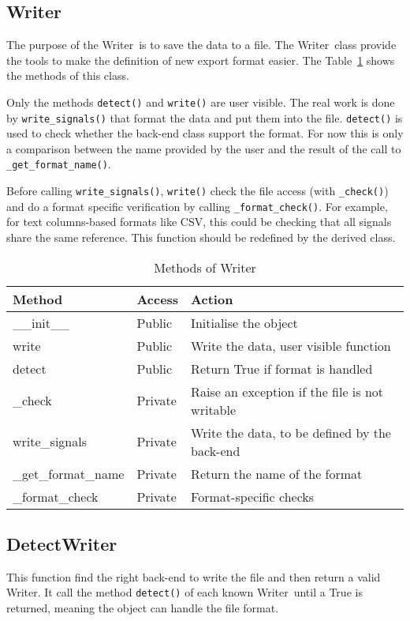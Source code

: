 \documentclass[a4paper,11pt]{article}
\newcommand{\meth}[1]{\texttt{#1()}}
\newcommand{\cls}[1]{\textsf{#1}}
\newcommand{\wrt}{\cls{Writer}}
\begin{document}
\subsection{Writer}
The purpose of the \wrt\ is to save the data to a file.
The \wrt\ class provide the tools to make the definition of new export format easier.
The Table~\ref{tab:wrts:meth} shows the methods of this class.

Only the methods \meth{detect} and \meth{write} are user visible.
The real work is done by \meth{write\_signals} that format the data and put them into the file.
\meth{detect} is used to check whether the back-end class support the format.
For now this is only a comparison between the name provided by the user and the result of the call to \meth{\_get\_format\_name}.

Before calling \meth{write\_signals}, \meth{write} check the file access (with \meth{\_check}) and do a format specific verification by calling \meth{\_format\_check}.
For example, for text columns-based formats like CSV, this could be checking that all signals share the same reference.
This function should be redefined by the derived class.

\begin{table}[htbp]
  \centering\sf\small
  \begin{tabular}{lll}
    \hline
    Method & Access & Action \\
    \hline
    \_\_init\_\_ & Public & Initialise the object \\
    write        & Public & Write the data, user visible function\\
    detect       & Public & Return True if format is handled\\
    \_check        & Private& Raise an exception if the file is not writable\\
    write\_signals  & Private& Write the data, to be defined by the back-end\\
    \_get\_format\_name&Private& Return the name of the format\\
    \_format\_check   & Private& Format-specific checks\\
    \hline
  \end{tabular}
  \caption{Methods of \wrt}
  \label{tab:wrts:meth}
\end{table}

\subsection{DetectWriter}
This function find the right back-end to write the file and then return a valid \wrt.
It call the method \meth{detect} of each known \wrt\ until a True is returned, meaning the object can handle the file format.
\end{document}
